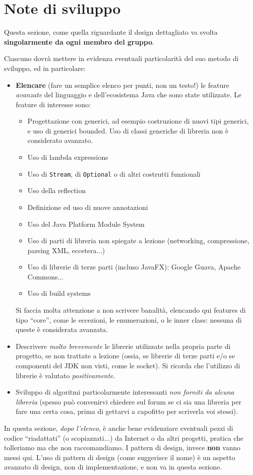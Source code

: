 \documentclass[a4paper,12pt]{report}
\begin{document}
\section{Note di sviluppo}

Questa sezione, come quella riguardante il design dettagliato va svolta \textbf{singolarmente da ogni membro del gruppo}.

Ciascuno dovrà mettere in evidenza eventuali particolarità del suo metodo di sviluppo, ed in particolare:
\begin{itemize}
	\item \textbf{Elencare} (fare un semplice elenco per punti, non un testo!) le feature \textit{avanzate} del linguaggio e dell'ecosistema Java che sono state
utilizzate. Le feature di interesse sono:
	\begin{itemize}
		\item Progettazione con generici, ad esempio costruzione di nuovi tipi generici, e uso di generici bounded. Uso di classi generiche di libreria non è considerato avanzato.
		\item Uso di lambda expressions
		\item Uso di \texttt{Stream}, di \texttt{Optional} o di altri costrutti funzionali
		\item Uso della reflection
		\item Definizione ed uso di nuove annotazioni
		\item Uso del Java Platform Module System
		\item Uso di parti di libreria non spiegate a lezione (networking, compressione, parsing XML, eccetera...)
		\item Uso di librerie di terze parti (incluso JavaFX): Google Guava, Apache Commons...
		\item Uso di build systems
	\end{itemize}
	Si faccia molta attenzione a non scrivere banalità, elencando qui features di tipo ``core'', come le eccezioni, le enumerazioni, o le inner class: nessuna di queste è considerata avanzata.
	\item Descrivere \textit{molto brevemente} le librerie utilizzate nella propria parte di progetto, se non trattate a lezione (ossia, se librerie di terze parti e/o se componenti del JDK non visti, come le socket). Si ricorda che l'utilizzo di librerie è valutato \emph{positivamente}.
	\item Sviluppo di algoritmi particolarmente interessanti \emph{non forniti da alcuna libreria} (spesso può convenirvi chiedere sul forum se ci sia una libreria per fare una certa cosa, prima di gettarvi a capofitto per scriverla voi stessi).
\end{itemize}
%
In questa sezione, \textit{dopo l'elenco}, è anche bene evidenziare eventuali pezzi di codice ``riadattati'' (o scopiazzati...) da Internet o da altri progetti, pratica che tolleriamo ma che non raccomandiamo.
%
I pattern di design, invece \textbf{non} vanno messi qui.
%
L'uso di pattern di design (come suggerisce il nome) è un aspetto avanzato di design, non di implementazione,
e non va in questa sezione.
\end{document}
